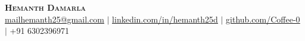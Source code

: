 \begin{center}
    \textbf{\Huge \scshape Hemanth Damarla} \\ \vspace{7pt}
    \href{mailhemanth25@gmail.com}{\underline{mailhemanth25@gmail.com}} $|$
    \href{https://www.linkedin.com/in/hemanth25d/}{\underline{linkedin.com/in/hemanth25d}} $|$
    \href{https://github.com/Coffee-0}{\underline{github.com/Coffee-0}} $|$
    +91 6302396971
\end{center}
